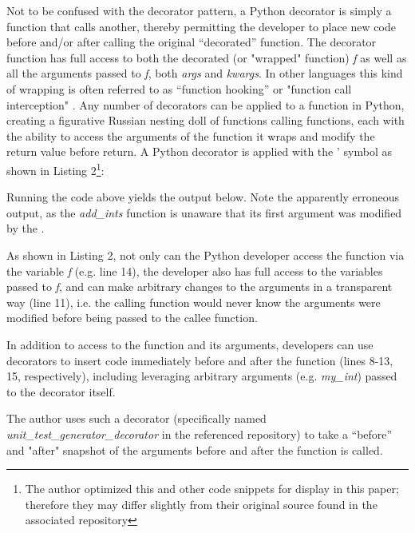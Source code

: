 Not to be confused with the decorator pattern, a Python decorator is simply a 
function that calls another, thereby permitting the developer to place new code 
before and/or after calling the original “decorated” function.  
The decorator function has full access to both the decorated 
(or "wrapped" function) \textit{f} as well as all the 
arguments passed to \textit{f}, both \textit{args} and \textit{kwargs}.  In other 
languages this kind of wrapping is often referred to as 
“function hooking” or "function call interception" 
 \cite{kang2018function}. Any number of decorators can be applied to a function 
in Python, creating a figurative Russian nesting doll of
functions calling functions, each with the ability to access the 
arguments of the function it wraps and modify the 
return value before return. A Python decorator is applied with the \lq@\rq 
symbol as shown in Listing 2\footnote{The author optimized this and other code snippets for display in 
this paper; therefore they may differ slightly from their original 
source found in the associated repository}:



Running the code above yields the output below. Note the apparently erroneous
output, as the \textit{add\_ints} function is unaware that its first argument was
modified by the .



As shown in Listing 2, not only can the Python developer access the function
via the variable \textit{f} (e.g. line 14), the developer also has full
access to the variables passed to \textit{f}, and can make 
arbitrary changes to the arguments in a transparent way (line 11), 
i.e. the calling function would never know the arguments 
were modified before being passed to the callee function.

In addition to access to the function and its arguments,
developers can use decorators to insert code immediately before and after 
the function (lines 8-13, 15, respectively), including leveraging arbitrary
arguments (e.g. \textit{my\_int}) passed to the decorator itself.

The author uses such a decorator (specifically named 
\break
\textit{unit\_test\_generator\_decorator} in the referenced repository) to take
 a “before” and "after" snapshot of the arguments
before and after the function is called.

